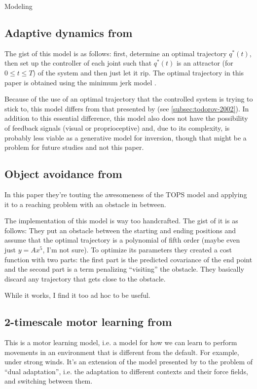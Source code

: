 \documentclass{report}
\begin{document}
\begin{chapter}{Modeling}
\subsection{Adaptive dynamics from \cite{Shadmehr_Adaptive_1994}}
\label{subsec:shadmehr-1994}
The gist of this model is as follows: first, determine an optimal trajectory
$q^*(t)$, then set up the controller of each joint such that $q^*(t)$ is an
attractor (for $0 \le t \le T$) of the system and then just let it rip. The
optimal trajectory in this paper is obtained using the minimum jerk model
\citep{Hogan_organizing_1984}.

Because of the use of an optimal trajectory that the controlled system is trying
to stick to, this model differs from that presented by
\cite{Todorov_Optimal_2002} (see \ref{subsec:todorov-2002}). In addition to this
essential difference, this model also does not have the possibility of feedback
signals (visual or proprioceptive) and, due to its complexity, is probably less
viable as a generative model for inversion, though that might be a problem for
future studies and not this paper.

\subsection{Object avoidance from \cite{Hamilton_Controlling_2002}}
In this paper they're touting the awesomeness of the TOPS model
\citep{Harris_Signaldependent_1998} and applying it to a reaching problem with
an obstacle in between.

The implementation of this model is way too handcrafted. The gist of it is as
follows: They put an obstacle between the starting and ending positions and
assume that the optimal trajectory is a polynomial of fifth order (maybe even
just $y = Ax^5$, I'm not sure). To optimize its parameters they created a cost
function with two parts: the first part is the predicted covariance of the end
point and the second part is a term penalizing ``visiting'' the obstacle. They
basically discard any trajectory that gets close to the obstacle.

While it works, I find it too ad hoc to be useful.


\subsection{2-timescale motor learning from \cite{Lee_Dual_2009}}
\label{subsec:lee-dual}
This is a motor learning model, i.e. a model for how we can learn to perform
movements in an environment that is different from the default. For example,
under strong winds. It's an extension of the model presented by
\cite{Smith_Interacting_2006} to the problem of ``dual adaptation'', i.e. the
adaptation to different contexts and their force fields, and switching between
them.


\end{chapter}
\end{document}
